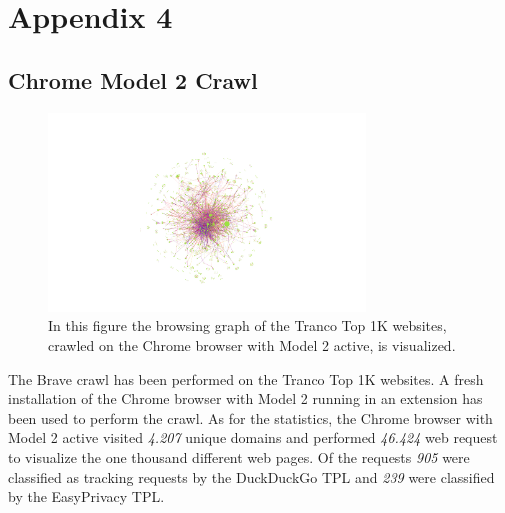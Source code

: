 
\chapter{Appendix 4}
\section{Chrome Model 2 Crawl}
\begin{figure}[ht!]
\begin{center}
\includegraphics[width=0.75\textwidth]{images/referrer.png}
\end{center}
\caption{In this figure the browsing graph of the Tranco Top 1K websites, crawled on the Chrome browser with Model 2 active, is visualized. }
\end{figure}
The Brave crawl has been performed on the Tranco Top 1K websites. A fresh installation of the Chrome browser with Model 2 running in an extension has been used to perform
the crawl. As for the statistics, the Chrome browser with Model 2 active visited \emph{4.207} unique domains and performed \emph{46.424} web request to 
visualize the one thousand different web pages. Of the requests \emph{905} were classified as tracking requests by the DuckDuckGo 
TPL and \emph{239} were classified by the EasyPrivacy TPL.
